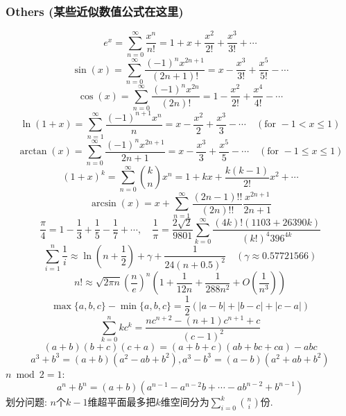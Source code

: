 \subsubsection{Others (某些近似数值公式在这里)}
\[ e^x = \sum_{n=0}^{\infty} \frac{x^n}{n!} = 1 + x + \frac{x^2}{2!} + \frac{x^3}{3!} + \cdots \]
\[ \sin(x) = \sum_{n=0}^{\infty} \frac{(-1)^n x^{2n+1}}{(2n+1)!} = x - \frac{x^3}{3!} + \frac{x^5}{5!} - \cdots \]
\[ \cos(x) = \sum_{n=0}^{\infty} \frac{(-1)^n x^{2n}}{(2n)!} = 1 - \frac{x^2}{2!} + \frac{x^4}{4!} - \cdots \]
\[ \ln(1+x) = \sum_{n=1}^{\infty} \frac{(-1)^{n+1} x^n}{n} = x - \frac{x^2}{2} + \frac{x^3}{3} - \cdots \quad (\text{for } -1 < x \leq 1) \]
\[ \arctan(x) = \sum_{n=0}^{\infty} \frac{(-1)^n x^{2n+1}}{2n+1} = x - \frac{x^3}{3} + \frac{x^5}{5} - \cdots \quad (\text{for } -1 \leq x \leq 1) \]
\[ (1+x)^k = \sum_{n=0}^{\infty} \binom{k}{n} x^n = 1 + kx + \frac{k(k-1)}{2!} x^2 + \cdots \]
\[ \arcsin(x) = x + \sum_{n=1}^{\infty} \frac{(2n-1)!!}{(2n)!!} \frac{x^{2n+1}}{2n+1} \]
\[ \frac{\pi}{4} = 1 - \frac{1}{3} + \frac{1}{5} - \frac{1}{7} + \cdots,\quad \frac{1}{\pi} = \frac{2\sqrt{2}}{9801} \sum_{k=0}^{\infty} \frac{(4k)!(1103 + 26390k)}{(k!)^4 396^{4k}} \]
\[ \sum_{i=1}^n\frac 1i \approx\ln\left(n + \frac 1 2\right) + \gamma + \frac{1}{24(n+0.5)^2} \quad (\gamma\approx0.57721566)\]
\[ n! \approx \sqrt{2\pi n}\left(\frac{n}{e}\right)^n\left(1+\frac{1}{12n}+\frac{1}{288n^2}+O\left(\frac{1}{n^3}\right)\right) \]
\[ \max{\{a,b,c\}} - \min{\{a,b,c\}} = \frac{1}{2}\left( |a-b| + |b-c| + |c-a| \right) \]
\[ \sum_{k=0}^nkc^k = \frac{nc^{n+2}-(n+1)c^{n+1}+c}{(c-1)^2} \]
\[ (a+b)(b+c)(c+a) = (a+b+c)(ab+bc+ca)-abc \]
\[ a^3+b^3=(a+b)(a^2-ab+b^2),a^3-b^3=(a-b)(a^2+ab+b^2) \]
$n\bmod 2=1:$
\[ a^n+b^n=(a+b)(a^{n-1}-a^{n-2}b+\cdots-ab^{n-2}+b^{n-1})\]
划分问题: $n$个$k-1$维超平面最多把$k$维空间分为$\sum_{i=0}^{k}\binom{n}{i}$份.
